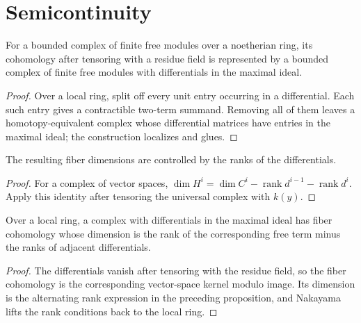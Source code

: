 \section{Semicontinuity}
\label{ha-ch3-sec12}
\begin{proposition}\label{ha-ch3-prop-universal-complex}
For a bounded complex of finite free modules over a noetherian ring, its
cohomology after tensoring with a residue field is represented by a bounded
complex of finite free modules with differentials in the maximal ideal.

\end{proposition}
\begin{proof}

Over a local ring, split off every unit entry occurring in a differential.  Each such entry gives a
contractible two-term summand.  Removing all of them leaves a homotopy-equivalent complex whose
 differential matrices have entries in the maximal ideal; the construction localizes and glues.

\end{proof}
\begin{proposition}\label{ha-ch3-prop-fiber-dimensions}
The resulting fiber dimensions are controlled by the ranks of the
differentials.

\end{proposition}
\begin{proof}

For a complex of vector spaces, $\dim H^i=\dim C^i-\operatorname{rank}d^{i-1}-\operatorname{rank}d^i$.
Apply this identity after tensoring the universal complex with $k(y)$.

\end{proof}
\begin{lemma}\label{ha-ch3-lem-minimal-complex}
Over a local ring, a complex with differentials in the maximal ideal has fiber
cohomology whose dimension is the rank of the corresponding free term minus
the ranks of adjacent differentials.

\end{lemma}
\begin{proof}

The differentials vanish after tensoring with the residue field, so the fiber cohomology is the
corresponding vector-space kernel modulo image.  Its dimension is the alternating rank expression in
the preceding proposition, and Nakayama lifts the rank conditions back to the local ring.

\end{proof}
